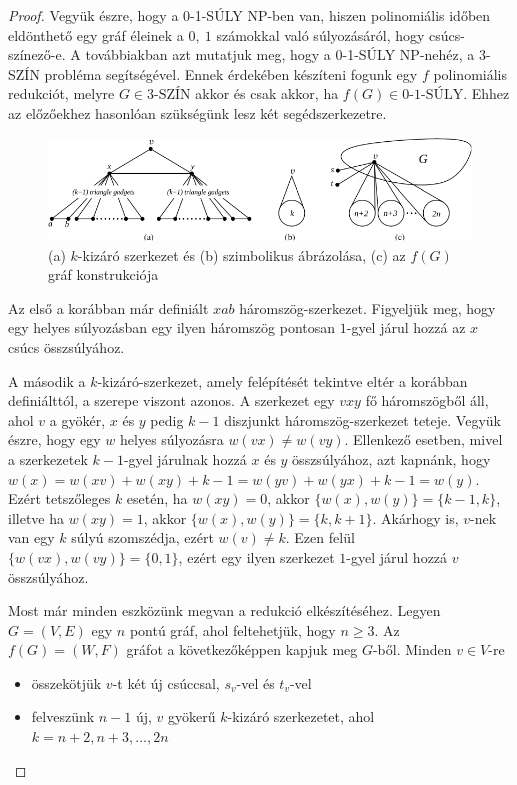 \documentclass[12pt, a4paper]{report}
\theoremstyle{remark}
\theoremstyle{definition}
\begin{document}
\begin{proof}
Vegyük észre, hogy a 0-1-SÚLY NP-ben van, hiszen polinomiális időben eldönthető egy gráf éleinek a $0,\ 1$ számokkal való súlyozásáról, hogy csúcs-színező-e. A továbbiakban azt mutatjuk meg, hogy a 0-1-SÚLY NP-nehéz, a 3-SZÍN probléma segítségével. Ennek érdekében készíteni fogunk egy $f$ polinomiális redukciót, melyre $G \in \textrm{3-SZÍN}$ akkor és csak akkor, ha $f(G) \in \textrm{0-1-SÚLY}$. Ehhez az előzőekhez hasonlóan szükségünk lesz két segédszerkezetre.

\begin{figure}[!h]
\centering
\includegraphics[width=\linewidth]{./images/gadgets01}
\caption{(a) $k$-kizáró szerkezet és (b) szimbolikus ábrázolása, (c) az $f(G)$ gráf konstrukciója}
\label{fig:gadgets01}
\end{figure}

Az első a korábban már definiált $xab$ háromszög-szerkezet. Figyeljük meg, hogy egy helyes súlyozásban egy ilyen háromszög pontosan $1$-gyel járul hozzá az $x$ csúcs összsúlyához. 

A második a $k$-kizáró-szerkezet, amely felépítését tekintve eltér a korábban definiálttól, a szerepe viszont azonos. A szerkezet egy $vxy$ fő háromszögből áll, ahol $v$ a gyökér, $x$ és $y$ pedig $k - 1$ diszjunkt háromszög-szerkezet teteje. Vegyük észre, hogy egy $w$ helyes súlyozásra $w(vx) \neq w(vy)$. Ellenkező esetben, mivel a szerkezetek $k - 1$-gyel járulnak hozzá $x$ és $y$ összsúlyához, azt kapnánk, hogy $w(x) = w(xv) + w(xy) + k - 1 = w(yv) + w(yx) + k - 1 = w(y)$. Ezért tetszőleges $k$ esetén, ha $w(xy) = 0$, akkor $\lbrace w(x), w(y) \rbrace = \lbrace k - 1, k \rbrace$, illetve ha $w(xy) = 1$, akkor $\lbrace w(x), w(y) \rbrace = \lbrace k, k + 1 \rbrace$. Akárhogy is, $v$-nek van egy $k$ súlyú szomszédja, ezért $w(v) \neq k$. Ezen felül $\lbrace w(vx), w(vy) \rbrace = \lbrace 0, 1 \rbrace$, ezért egy ilyen szerkezet $1$-gyel járul hozzá $v$ összsúlyához.

Most már minden eszközünk megvan a redukció elkészítéséhez. Legyen $G = (V, E)$ egy $n$ pontú gráf, ahol feltehetjük, hogy $n \geq 3$. Az $f(G) = (W, F)$ gráfot a következőképpen kapjuk meg $G$-ből. Minden $v \in V$-re
\begin{itemize}
\item összekötjük $v$-t két új csúccsal, $s_v$-vel és $t_v$-vel
\item felveszünk $n - 1$ új, $v$ gyökerű $k$-kizáró szerkezetet, ahol $k = n + 2, n + 3, \ldots, 2n$
\end{itemize}


\end{proof}
\end{document}
